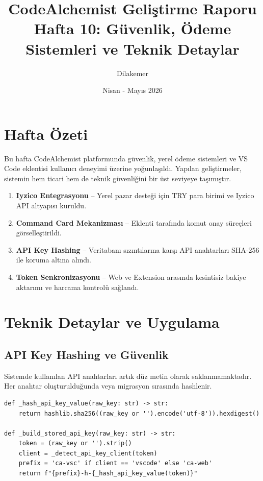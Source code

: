 \documentclass[12pt,a4paper]{article}
\title{\textbf{CodeAlchemist Geliştirme Raporu\\Hafta 10: Güvenlik, Ödeme Sistemleri ve Teknik Detaylar}}
\author{Dilakemer}
\date{Nisan - Mayıs 2026}
\begin{document}
\maketitle

\section{Hafta Özeti}

Bu hafta CodeAlchemist platformunda güvenlik, yerel ödeme sistemleri ve VS Code eklentisi kullanıcı deneyimi üzerine yoğunlaşıldı. Yapılan geliştirmeler, sistemin hem ticari hem de teknik güvenliğini bir üst seviyeye taşımıştır.

\begin{enumerate}
    \item \textbf{Iyzico Entegrasyonu} -- Yerel pazar desteği için TRY para birimi ve Iyzico API altyapısı kuruldu.
    \item \textbf{Command Card Mekanizması} -- Eklenti tarafında komut onay süreçleri görselleştirildi.
    \item \textbf{API Key Hashing} -- Veritabanı sızıntılarına karşı API anahtarları SHA-256 ile koruma altına alındı.
    \item \textbf{Token Senkronizasyonu} -- Web ve Extension arasında kesintisiz bakiye aktarımı ve harcama kontrolü sağlandı.
\end{enumerate}

\section{Teknik Detaylar ve Uygulama}

\subsection{API Key Hashing ve Güvenlik}

Sistemde kullanılan API anahtarları artık düz metin olarak saklanmamaktadır. Her anahtar oluşturulduğunda veya migrasyon sırasında hashlenir.

\begin{lstlisting}[caption={API Key Hashing Mantığı (app.py)}]
def _hash_api_key_value(raw_key: str) -> str:
    return hashlib.sha256((raw_key or '').encode('utf-8')).hexdigest()

def _build_stored_api_key(raw_key: str) -> str:
    token = (raw_key or '').strip()
    client = _detect_api_key_client(token)
    prefix = 'ca-vsc' if client == 'vscode' else 'ca-web'
    return f"{prefix}-h-{_hash_api_key_value(token)}"
\end{lstlisting}
\end{document}
